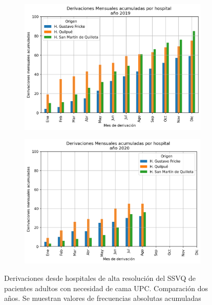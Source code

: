 \documentclass{article}
\begin{document}
\begin{figure}[h]
	\centering
	\begin{subfigure}{.5\textwidth}
		\includegraphics[width=.8\linewidth]{./figuras/Derivaciones_acumuladas2019.png}
	\end{subfigure}%
	\begin{subfigure}{.5\textwidth}
		\includegraphics[width=.8\linewidth]{./figuras/Derivaciones_acumuladas2020.png}
	\end{subfigure}
	\caption{Derivaciones desde hospitales de alta resolución del SSVQ de pacientes adultos con necesidad de cama UPC. Comparación dos años. Se muestran valores de frecuencias absolutas acumuladas}
	\label{fig: comparativa derivaciones 2 anos}
\end{figure}


\newpage


\end{document}
